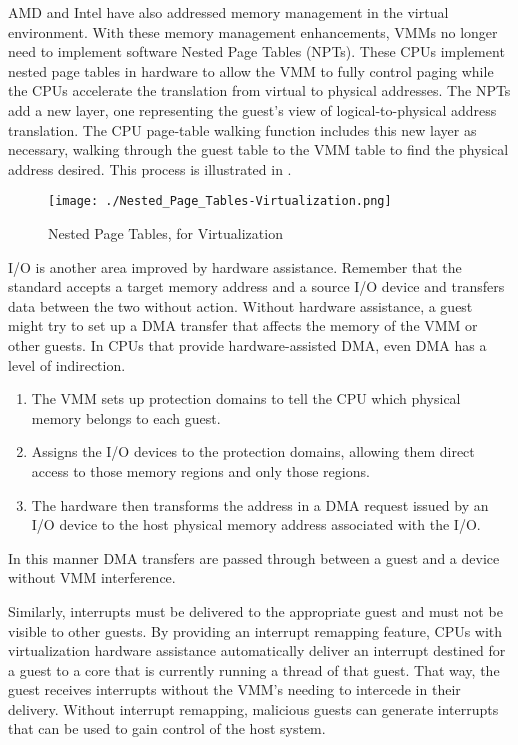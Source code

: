 AMD and Intel have also addressed memory management in the virtual environment.
With these memory management enhancements, VMMs no longer need to implement software Nested Page Tables (NPTs).
These CPUs implement nested page tables in hardware to allow the VMM to fully control paging while the CPUs accelerate the translation from virtual to physical addresses.
The NPTs add a new layer, one representing the guest's view of logical-to-physical address translation.
The CPU page-table walking function includes this new layer as necessary, walking through the guest table to the VMM table to find the physical address desired.
This process is illustrated in .

\begin{figure}[h!tbp]
  \centering
  \texttt{[image: ./Nested\_Page\_Tables-Virtualization.png]}
  \caption{Nested Page Tables, for Virtualization}
  \label{fig:Nested_Page_Tables}
\end{figure}

I/O is another area improved by hardware assistance.
Remember that the standard  accepts a target memory address and a source I/O device and transfers data between the two without  action.
Without hardware assistance, a guest might try to set up a DMA transfer that affects the memory of the VMM or other guests.
In CPUs that provide hardware-assisted DMA, even DMA has a level of indirection.
\begin{enumerate}[noitemsep]
\item The VMM sets up protection domains to tell the CPU which physical memory belongs to each guest.
\item Assigns the I/O devices to the protection domains, allowing them direct access to those memory regions and only those regions.
\item The hardware then transforms the address in a DMA request issued by an I/O device to the host physical memory address associated with the I/O.
\end{enumerate}

In this manner DMA transfers are passed through between a guest and a device without VMM interference.

Similarly, interrupts must be delivered to the appropriate guest and must not be visible to other guests.
By providing an interrupt remapping feature, CPUs with virtualization hardware assistance automatically deliver an interrupt destined for a guest to a core that is currently running a thread of that guest.
That way, the guest receives interrupts without the VMM's needing to intercede in their delivery.
Without interrupt remapping, malicious guests can generate interrupts that can be used to gain control of the host system.

